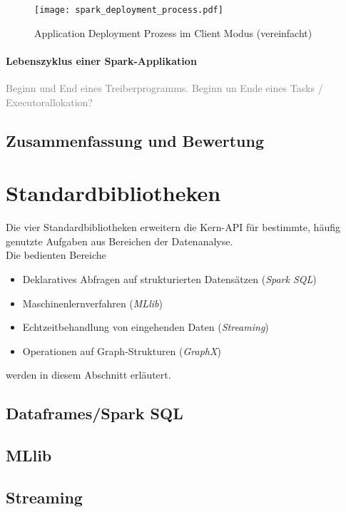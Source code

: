 \begin{figure}[ht!]
	\centering
  \texttt{[image: spark\_deployment\_process.pdf]}
	\caption{Application Deployment Prozess im Client Modus (vereinfacht)}
	\label{fig:app_deployment_process}
\end{figure}

\paragraph{Lebenszyklus einer Spark-Applikation}

\textcolor{gray}{Beginn und End eines Treiberprogramms. Beginn un Ende eines Tasks / Executorallokation?}\\

\subsection{Zusammenfassung und Bewertung}

\section{Standardbibliotheken}
Die vier Standardbibliotheken erweitern die Kern-API für bestimmte, häufig genutzte Aufgaben aus Bereichen der Datenanalyse.\\

Die bedienten Bereiche
\begin{itemize}
	\item Deklaratives Abfragen auf strukturierten Datensätzen (\textit{Spark SQL})
	\item Maschinenlernverfahren (\textit{MLlib})
	\item Echtzeitbehandlung von eingehenden Daten (\textit{Streaming})
	\item Operationen auf Graph-Strukturen (\textit{GraphX})
\end{itemize}
werden in diesem Abschnitt erläutert.

\subsection{Dataframes/Spark SQL}


\subsection{MLlib}
\subsection{Streaming}
